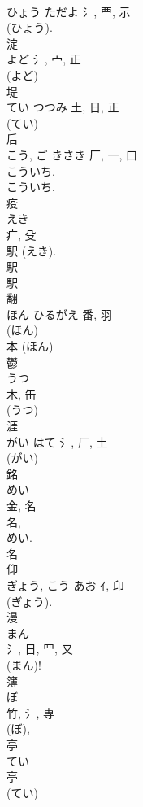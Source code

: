\documentclass[8pt]{extreport}
\begin{document}
\begin{CJK}{UTF8}{min}
\\	ひょう	ただよ	氵, 覀, 示	
\\	(ひょう).
\\	淀	
\\	よど	氵, 宀, 正	
\\	(よど) 
\\	堤	
\\	てい	つつみ	土, 日, 正	
\\	(てい) 
\\	后	
\\	こう, ご	きさき	厂, 一, 口	
\\	こういち.
\\	こういち.	
\\	疫	
\\	えき	
\\	疒, 殳	
\\	駅 (えき). 
\\	駅 
\\	駅 
\\	翻	
\\	ほん	ひるがえ	番, 羽	
\\	(ほん) 
\\	本 (ほん) 
\\	鬱	
\\	うつ	
\\	木, 缶		
\\	(うつ) 
\\	涯	
\\	がい	はて	氵, 厂, 土	
\\	(がい) 
\\	銘	
\\	めい	
\\	金, 名	
\\	名, 
\\	めい.
\\	名 
\\	仰	
\\	ぎょう, こう	あお	ｲ, 卬	
\\	(ぎょう).	
\\	漫	
\\	まん	
\\	氵, 日, 罒, 又	
\\	(まん)!	
\\	簿	
\\	ぼ	
\\	竹, 氵, 専	
\\	(ぼ), 
\\	亭	
\\	てい	
\\	亭	
\\	(てい) 

\end{CJK}
\end{document}
